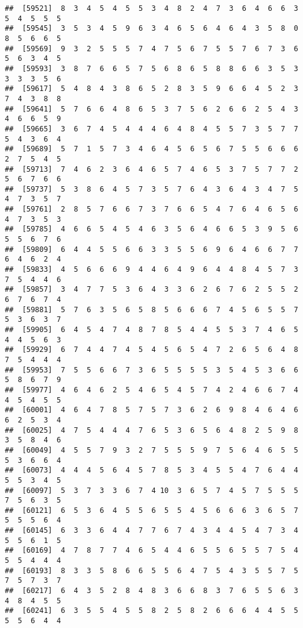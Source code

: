 \documentclass[
]{book}
\begin{document}
\begin{verbatim}
##  [59521]  8  3  4  5  4  5  5  3  4  8  2  4  7  3  6  4  6  6  3  5  4  5  5  5
##  [59545]  3  5  3  4  5  9  6  3  4  6  5  6  4  6  4  3  5  8  0  8  5  6  6  5
##  [59569]  9  3  2  5  5  5  7  4  7  5  6  7  5  5  7  6  7  3  6  5  6  3  4  5
##  [59593]  3  8  7  6  6  5  7  5  6  8  6  5  8  8  6  6  3  5  3  3  3  3  5  6
##  [59617]  5  4  8  4  3  8  6  5  2  8  3  5  9  6  6  4  5  2  3  7  4  3  8  8
##  [59641]  5  7  6  6  4  8  6  5  3  7  5  6  2  6  6  2  5  4  3  4  6  6  5  9
##  [59665]  3  6  7  4  5  4  4  4  6  4  8  4  5  5  7  3  5  7  7  5  4  3  6  4
##  [59689]  5  7  1  5  7  3  4  6  4  5  6  5  6  7  5  5  6  6  6  2  7  5  4  5
##  [59713]  7  4  6  2  3  6  4  6  5  7  4  6  5  3  7  5  7  7  2  5  6  7  6  6
##  [59737]  5  3  8  6  4  5  7  3  5  7  6  4  3  6  4  3  4  7  5  4  7  3  5  7
##  [59761]  2  8  5  7  6  6  7  3  7  6  6  5  4  7  6  4  6  5  6  4  7  3  5  3
##  [59785]  4  6  6  5  4  5  4  6  3  5  6  4  6  6  5  3  9  5  6  5  5  6  7  6
##  [59809]  6  4  4  5  5  6  6  3  3  5  5  6  9  6  4  6  6  7  7  6  4  6  2  4
##  [59833]  4  5  6  6  6  9  4  4  6  4  9  6  4  4  8  4  5  7  3  7  5  4  4  6
##  [59857]  3  4  7  7  5  3  6  4  3  3  6  2  6  7  6  2  5  5  2  6  7  6  7  4
##  [59881]  5  7  6  3  5  6  5  8  5  6  6  6  7  4  5  6  5  5  7  5  3  6  3  7
##  [59905]  6  4  5  4  7  4  8  7  8  5  4  4  5  5  3  7  4  6  5  4  4  5  6  3
##  [59929]  6  7  4  4  7  4  5  4  5  6  5  4  7  2  6  5  6  4  8  7  5  4  4  4
##  [59953]  7  5  5  6  6  7  3  6  5  5  5  5  3  5  4  5  3  6  6  5  8  6  7  9
##  [59977]  4  6  4  6  2  5  4  6  5  4  5  7  4  2  4  6  6  7  4  4  5  4  5  5
##  [60001]  4  6  4  7  8  5  7  5  7  3  6  2  6  9  8  4  6  4  6  6  2  5  3  4
##  [60025]  4  7  5  4  4  4  7  6  5  3  6  5  6  4  8  2  5  9  8  3  5  8  4  6
##  [60049]  4  5  5  7  9  3  2  7  5  5  5  9  7  5  6  4  6  5  5  5  3  6  6  4
##  [60073]  4  4  4  5  6  4  5  7  8  5  3  4  5  5  4  7  6  4  4  5  5  3  4  5
##  [60097]  5  3  7  3  3  6  7  4 10  3  6  5  7  4  5  7  5  5  5  7  5  6  3  5
##  [60121]  6  5  3  6  4  5  5  6  5  5  4  5  6  6  6  3  6  5  7  5  5  5  6  4
##  [60145]  6  3  3  6  4  4  7  7  6  7  4  3  4  4  5  4  7  3  4  5  5  6  1  5
##  [60169]  4  7  8  7  7  4  6  5  4  4  6  5  5  6  5  5  7  5  4  5  5  4  4  4
##  [60193]  8  3  3  5  8  6  6  5  5  6  4  7  5  4  3  5  5  7  5  7  5  7  3  7
##  [60217]  6  4  3  5  2  8  4  8  3  6  6  8  3  7  6  5  5  6  3  4  8  4  5  5
##  [60241]  6  3  5  5  4  5  5  8  2  5  8  2  6  6  6  4  4  5  5  5  5  6  4  4

\end{verbatim}
\end{document}
